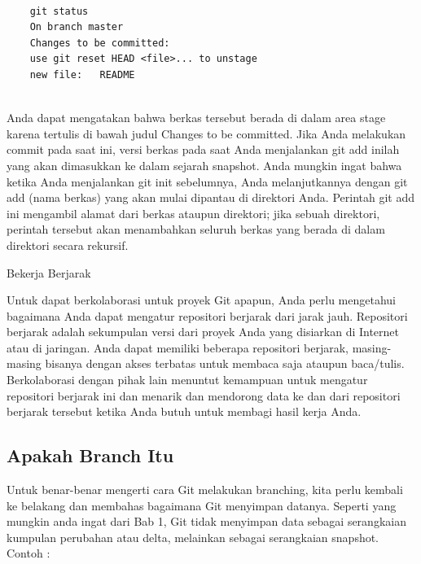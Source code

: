 {{{{{{{{\begin{verbatim}
	
	git status
	On branch master
	Changes to be committed:
	use git reset HEAD <file>... to unstage
	new file:   README
	
	\end{verbatim}
	
	\vspace{14pt}
	\noindent
	{\fontsize{14pt}{14pt}\selectfont
		
		
	Anda dapat mengatakan bahwa berkas tersebut berada di dalam area stage karena tertulis di bawah judul Changes to be committed. Jika Anda melakukan commit pada saat ini, versi berkas pada saat Anda menjalankan git add inilah yang akan dimasukkan ke dalam sejarah snapshot. Anda mungkin ingat bahwa ketika Anda menjalankan git init sebelumnya, Anda melanjutkannya dengan git add (nama berkas) yang akan mulai dipantau di direktori Anda. Perintah git add ini mengambil alamat dari berkas ataupun direktori; jika sebuah direktori, perintah tersebut akan menambahkan seluruh berkas yang berada di dalam direktori secara rekursif.
	
\vspace{14pt}
	\noindent
	{\fontsize{14pt}{14pt}\selectfont
	Bekerja Berjarak
	
	\vspace{14pt}
	\noindent
	{\fontsize{14pt}{14pt}\selectfont
	Untuk dapat berkolaborasi untuk proyek Git apapun, Anda perlu mengetahui bagaimana Anda dapat mengatur repositori berjarak dari jarak jauh. Repositori berjarak adalah sekumpulan versi dari proyek Anda yang disiarkan di Internet atau di jaringan. Anda dapat memiliki beberapa repositori berjarak, masing-masing bisanya dengan akses terbatas untuk membaca saja ataupun baca/tulis. Berkolaborasi dengan pihak lain menuntut kemampuan untuk mengatur repositori berjarak ini dan menarik dan mendorong data ke dan dari repositori berjarak tersebut ketika Anda butuh untuk membagi hasil kerja Anda.
	
	\vspace{14pt}
	\noindent
	{\fontsize{14pt}{14pt}\subsection
	{Apakah Branch Itu}
	\vspace{14pt}
	\noindent
	{\fontsize{14pt}{14pt}\selectfont
	Untuk benar-benar mengerti cara Git melakukan branching, kita perlu kembali ke belakang dan membahas bagaimana Git menyimpan datanya. Seperti yang mungkin anda ingat dari Bab 1, Git tidak menyimpan data sebagai serangkaian kumpulan perubahan atau delta, melainkan sebagai serangkaian snapshot. Contoh :
	
}}}}}}}}}}}}}
